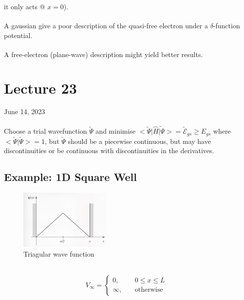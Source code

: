 \documentclass[12pt,fancychapters]{report}
\numberwithin{equation}{section}
\begin{document}
it only acts @ $x=0$).\\
\\
A gaussian give a poor description of the quasi-free electron under a $\delta$-function potential.\\
\\
A free-electron (plane-wave) description might yield better results.
\newpage
\section{Lecture 23}
June 14, 2023\\
\\
Choose a trial wavefunction $\tilde{\Psi}$ and minimise $\big<\tilde{\Psi}\big|\hat{H}\tilde{
\big|\Psi}\big> = \tilde{\mathcal{E}}_{gs} \geq E_{gs}$ where $\big<\tilde{\Psi}\big|\tilde
{\Psi}\big> = 1$, but $\tilde{\Psi}$ should be a piecewise continuous, but may have discontinuities 
or be continuous with discontinuities in the derivatives.

\subsection{Example: 1D Square Well}
\begin{figure}
  \begin{center}
\includegraphics[width=0.4\textwidth]{../Figures/L23_1.png}
  \end{center}
  \caption{Triagular wave function}
\end{figure}
\
\
\[
V_\infty =
\begin{cases}
  0, & \quad 0 \leq x \leq L\\
  \infty, & \quad \text{otherwise}
\end{cases}
\]
\end{document}
